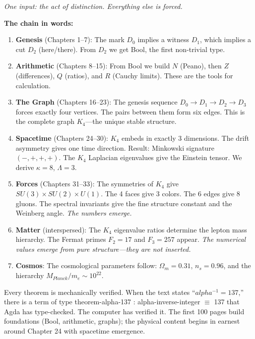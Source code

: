 \documentclass[11pt,a4paper]{book}
\def\alpha{alpha}%
\def\mathbb#1{#1}%
\def\texttt#1{#1}%
\def\text#1{#1}%
\begin{document}
\medskip
\noindent\textit{One input: the act of distinction. Everything else is forced.}

\bigskip

\noindent\textbf{The chain in words:}

\begin{enumerate}
\item \textbf{Genesis} (Chapters 1--7): The mark $D_0$ implies a witness $D_1$, which 
implies a cut $D_2$ (here/there). From $D_2$ we get Bool, the first non-trivial type.

\item \textbf{Arithmetic} (Chapters 8--15): From Bool we build $\mathbb{N}$ (Peano), 
then $\mathbb{Z}$ (differences), $\mathbb{Q}$ (ratios), and $\mathbb{R}$ (Cauchy limits). 
These are the tools for calculation.

\item \textbf{The Graph} (Chapters 16--23): The genesis sequence $D_0 \to D_1 \to D_2 \to D_3$ 
forces exactly four vertices. The pairs between them form six edges. This is the complete 
graph $K_4$---the unique stable structure.

\item \textbf{Spacetime} (Chapters 24--30): $K_4$ embeds in exactly 3 dimensions. The 
drift asymmetry gives one time direction. Result: Minkowski signature $(-,+,+,+)$. 
The $K_4$ Laplacian eigenvalues give the Einstein tensor. We derive $\kappa = 8$, 
$\Lambda = 3$.

\item \textbf{Forces} (Chapters 31--33): The symmetries of $K_4$ give $SU(3) \times SU(2) \times U(1)$. 
The 4 faces give 3 colors. The 6 edges give 8 gluons. The spectral invariants give 
the fine structure constant and the Weinberg angle. \emph{The numbers emerge.}

\item \textbf{Matter} (interspersed): The $K_4$ eigenvalue ratios determine the lepton mass hierarchy. The Fermat primes $F_2 = 17$ and $F_3 = 257$ appear. \emph{The numerical values emerge from pure structure---they are not inserted.}

\item \textbf{Cosmos}: The cosmological parameters follow: $\Omega_m = 0.31$, 
$n_s = 0.96$, and the hierarchy $M_{\text{Planck}}/m_e \sim 10^{22}$.
\end{enumerate}

\medskip

Every theorem is mechanically verified. When the text states ``$\alpha^{-1} = 137$,''
there is a term of type \texttt{theorem-alpha-137 : alpha-inverse-integer $\equiv$ 137}
that Agda has type-checked. The computer has verified it. The first 100 pages build
foundations (Bool, arithmetic, graphs); the physical content begins in earnest around
Chapter 24 with spacetime emergence.
\end{document}

